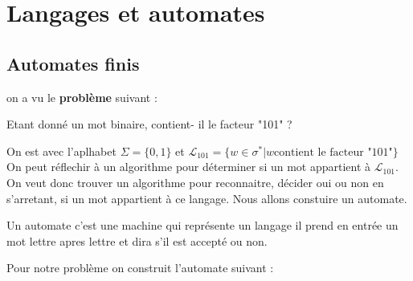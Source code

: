 \chapter{Langages et automates}

\section{Automates finis}

on a vu le \textbf{problème} suivant :

Etant donné un mot binaire, contient- il le facteur "101" ?
\smallskip

On est avec l'aplhabet $\Sigma = \{0,1\}$ et $\mathcal{L}_{101} = \{w\in \sigma^* | w \text{contient le facteur "101"}\}$
On peut réflechir à un algorithme pour déterminer si un mot appartient à $ \mathcal{L}_{101}$.
On veut donc trouver un algorithme pour reconnaitre, décider oui ou non en s'arretant, si un mot appartient à ce langage.
Nous allons constuire un automate.

\begin{definition}[informel]
    Un automate c'est une machine qui représente un langage il prend en entrée un mot lettre apres lettre et dira s'il est accepté ou non.
\end{definition}
Pour notre problème on construit l'automate suivant : 

